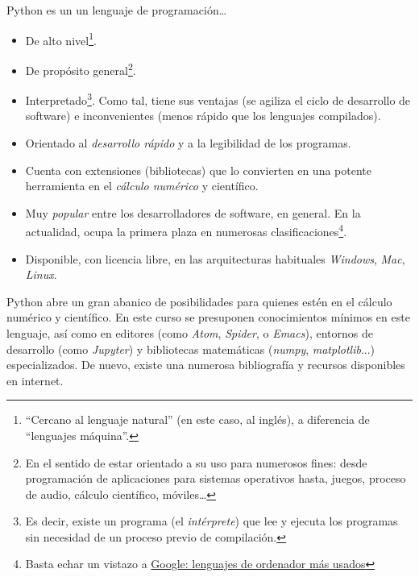 Python es un un lenguaje de programación\ldots{}
\begin{itemize}
\item De alto nivel\footnote{``Cercano al lenguaje
    natural'' (en este caso, al inglés), a diferencia de
    ``lenguajes máquina''.}.
\item De propósito general\footnote{En el sentido de estar orientado a
    su uso para numerosos fines: desde programación de aplicaciones para
    sistemas operativos hasta, juegos, proceso de audio, cálculo
    científico, móviles\ldots{}}.
\item Interpretado\footnote{Es decir, existe un programa (el
    \emph{intérprete}) que lee y ejecuta los programas sin necesidad
    de un proceso previo de compilación.}. Como tal, tiene sus ventajas
  (se agiliza el ciclo de desarrollo de software) e inconvenientes
  (menos rápido que los lenguajes compilados).
\item Orientado al \emph{desarrollo rápido} y a la legibilidad de los programas.
\item Cuenta con extensiones (bibliotecas) que lo convierten en una
      potente herramienta en el \emph{cálculo numérico} y científico.
    \item Muy \emph{popular} entre los desarrolladores de software, en
      general. En la actualidad, ocupa la primera plaza en numerosas
      clasificaciones\footnote{Basta echar un vistazo a \href{https://www.google.com/search?channel=fs&client=ubuntu&q=lenguajes+de+ordenador+m\%C3\%A1s+usados}{Google: lenguajes de ordenador más usados}}.
    \item Disponible, con licencia libre, en las arquitecturas habituales \emph{Windows},
  \emph{Mac}, \emph{Linux}.
\end{itemize}

Python abre un gran abanico de posibilidades para quienes estén
en el cálculo numérico y científico. En este
curso se presuponen conocimientos mínimos en este lenguaje, así como
en editores (como \textit{Atom}, \textit{Spider}, o \textit{Emacs}),
entornos de desarrollo (como \textit{Jupyter}) y bibliotecas
matemáticas (\textit{numpy}, \textit{matplotlib}...)
especializados. De nuevo, existe una numerosa bibliografía y recursos
disponibles en internet.


